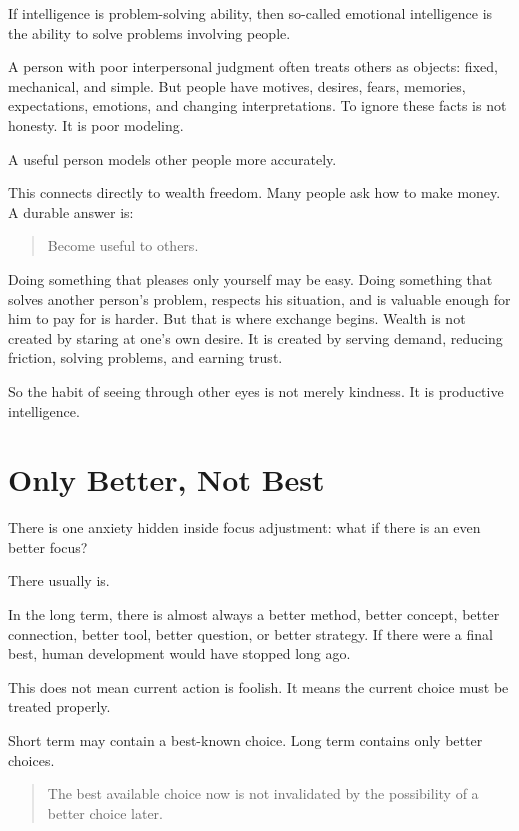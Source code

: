 If intelligence is problem-solving ability, then so-called emotional intelligence is the ability to solve problems involving people.

A person with poor interpersonal judgment often treats others as objects: fixed, mechanical, and simple. But people have motives, desires, fears, memories, expectations, emotions, and changing interpretations. To ignore these facts is not honesty. It is poor modeling.

A useful person models other people more accurately.

This connects directly to wealth freedom. Many people ask how to make money. A durable answer is:

\begin{quote}
Become useful to others.
\end{quote}

Doing something that pleases only yourself may be easy. Doing something that solves another person's problem, respects his situation, and is valuable enough for him to pay for is harder. But that is where exchange begins. Wealth is not created by staring at one's own desire. It is created by serving demand, reducing friction, solving problems, and earning trust.

So the habit of seeing through other eyes is not merely kindness. It is productive intelligence.

\section*{Only Better, Not Best}

There is one anxiety hidden inside focus adjustment: what if there is an even better focus?

There usually is.

In the long term, there is almost always a better method, better concept, better connection, better tool, better question, or better strategy. If there were a final best, human development would have stopped long ago.

This does not mean current action is foolish. It means the current choice must be treated properly.

Short term may contain a best-known choice. Long term contains only better choices.

\begin{quote}
The best available choice now is not invalidated by the possibility of a better choice later.
\end{quote}

